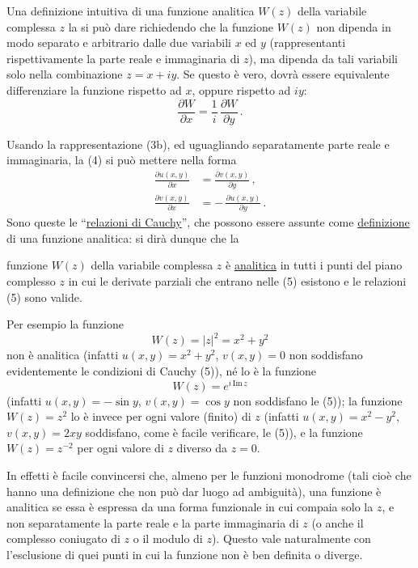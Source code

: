 \documentclass[11pt, a4paper]{book}
\numberwithin{equation}{section}
\begin{document}
Una definizione intuitiva di una funzione analitica $W(z)$ della variabile complessa $z$ la si può dare richiedendo che la funzione $W(z)$ non dipenda in modo separato e arbitrario dalle due variabili $x$ ed $y$ (rappresentanti rispettivamente la parte reale e immaginaria di $z$), ma dipenda da tali variabili solo nella combinazione $z = x + iy$. Se questo è vero, dovrà essere equivalente differenziare la funzione rispetto ad $x$, oppure rispetto ad $iy$:
\begin{equation}
\frac{\partial W}{\partial x} = \frac{1}{i}\,\frac{\partial W}{\partial y}\,. \tag{4}
\end{equation}

Usando la rappresentazione (3b), ed uguagliando separatamente parte reale e immaginaria, la (4) si può mettere nella forma
\begin{align}
\frac{\partial u(x,y)}{\partial x} &= \frac{\partial v(x,y)}{\partial y}\,, \tag{5a}\\
\frac{\partial v(x,y)}{\partial x} &= -\,\frac{\partial u(x,y)}{\partial y}\,. \tag{5b}
\end{align}
Sono queste le ``\uline{relazioni di Cauchy}'', che possono essere assunte come \uline{definizione} di una funzione analitica: si dirà dunque che la


funzione $W(z)$ della variabile complessa $z$ è \uline{analitica} in tutti i punti del piano complesso $z$ in cui le derivate parziali che entrano nelle (5) esistono e le relazioni (5) sono valide.

Per esempio la funzione
\begin{equation}
W(z) = |z|^2 = x^2 + y^2 \tag{6a}
\end{equation}
non è analitica (infatti $u(x,y) = x^2 + y^2$, $v(x,y) = 0$ non soddisfano evidentemente le condizioni di Cauchy (5)), né lo è la funzione
\begin{equation}
W(z) = e^{i\,\mathrm{Im}\, z} \tag{6b}
\end{equation}
(infatti $u(x,y) = -\sin y$, $v(x,y) = \cos y$ non soddisfano le (5)); la funzione $W(z) = z^2$ lo è invece per ogni valore (finito) di $z$ (infatti $u(x,y) = x^2 - y^2$, $v(x,y) = 2xy$ soddisfano, come è facile verificare, le (5)), e la funzione $W(z) = z^{-2}$ per ogni valore di $z$ diverso da $z=0$.

In effetti è facile convincersi che, almeno per le funzioni monodrome (tali cioè che hanno una definizione che non può dar luogo ad ambiguità), una funzione è analitica se essa è espressa da una forma funzionale in cui compaia solo la $z$, e non separatamente la parte reale e la parte immaginaria di $z$ (o anche il complesso coniugato di $z$ o il modulo di $z$). Questo vale naturalmente con l'esclusione di quei punti in cui la funzione non è ben definita o diverge.
\end{document}
